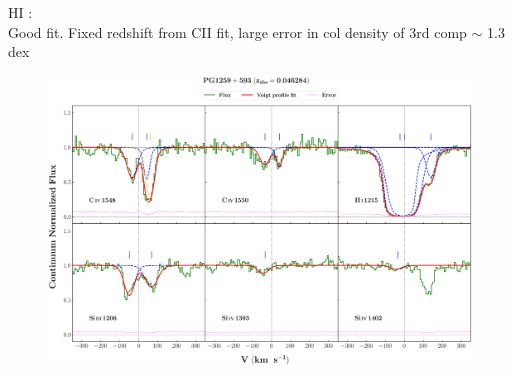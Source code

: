 \documentclass[12pt,draft]{report}
\begin{document}
HI :  \\  \hspace*{1.5cm}
        Good fit. Fixed redshift from CII fit, large error in col density of 3rd comp  $\sim$  1.3 dex \\



\newpage

\begin{landscape}

\begin{figure}
    \centering
    \vspace{-20mm}
    \hspace*{-35mm}
    \includegraphics[width=1.25\linewidth]{System-Plots/PG1259+593_z=0.046284_sys_plot.png}
\end{figure}

\end{landscape}
\end{document}
